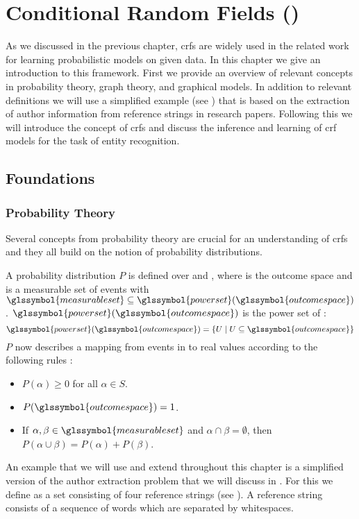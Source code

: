 \chapter{Conditional Random Fields ()}\label{cha:crfs}

As we discussed in the previous chapter, \glspl{crf} are widely used in the related work for learning probabilistic models on given data.
In this chapter we give an introduction to this framework.
First we provide an overview of relevant concepts in probability theory, graph theory, and graphical models.
In addition to relevant definitions we will use a simplified example (see ) that is based on the extraction of author information from reference strings in research papers.
Following this we will introduce the concept of \glspl{crf} and discuss the inference and learning of \gls{crf} models for the task of entity recognition.

\section{Foundations}\label{sec:foundations}
\subsection{Probability Theory}\label{subsec:probability-theory}
Several concepts from probability theory are crucial for an understanding of \glspl{crf} and they all build on the notion of \glspl{probability distribution}.

A \gls{probability distribution} $P$ is defined over  and , where  is the \gls{outcome space} and  is a \gls{measurable set} of \glspl{event} with $\glssymbol{measurable set}\subseteq \glssymbol{power set} (\glssymbol{outcome space})$ \citep{koller2009probabilistic}.
$\glssymbol{power set}(\glssymbol{outcome space})$ is the \gls{power set} of :
\begin{equation}
  \label{equ:power-set}
  \glssymbol{power set}(\glssymbol{outcome space})=\left\{U\mid U\subseteq \glssymbol{outcome space}\right\}
\end{equation}
$P$ now describes a mapping from events in  to real values according to the following rules \citep{koller2009probabilistic}:
\begin{itemize}
  \item $P(\alpha)\geq 0 $ for all $ \alpha \in S$.
  \item $P(\glssymbol{outcome space})=1$.
  \item If $\alpha,\beta\in \glssymbol{measurable set}$ and $\alpha\cap\beta = \emptyset$, then $P(\alpha\cup\beta)=P(\alpha)+P(\beta)$.
\end{itemize}
An example that we will use and extend throughout this chapter is a simplified version of the author extraction problem that we will discuss in .
For this we define  as a set consisting of four reference strings (see ).
A reference string consists of a sequence of words which are separated by whitespaces.

